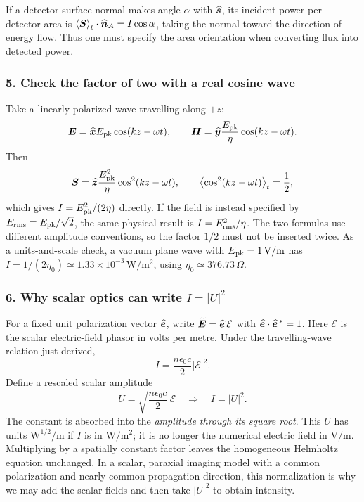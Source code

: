 If a detector surface normal makes angle $\alpha$ with
$\widehat{\bm{s}}$, its incident power per detector area is
$\left\langle \bm{S}\right\rangle_t\cdot\widehat{\bm{n}}_A=I\cos\alpha$, taking the normal
toward the direction of energy flow. Thus one must specify the area
orientation when converting flux into detected power.

\subsubsection*{5. Check the factor of two with a real cosine wave}
Take a linearly polarized wave travelling along $+z$:
\[
\bm{E}=\widehat{\bm{x}}E_{\rm pk}\cos(kz-\omega t),\qquad
\bm{H}=\widehat{\bm{y}}\frac{E_{\rm pk}}{\eta}
\cos(kz-\omega t).
\]
Then
\[
\bm{S}=\widehat{\bm{z}}\frac{E_{\rm pk}^2}{\eta}
\cos^2(kz-\omega t),\qquad
\left\langle \cos^2(kz-\omega t)\right\rangle_t=\frac12,
\]
which gives $I=E_{\rm pk}^2/(2\eta)$ directly.
If the field is instead specified by
$E_{\rm rms}=E_{\rm pk}/\sqrt2$, the same physical result is
$I=E_{\rm rms}^2/\eta$.
The two formulas use different amplitude conventions, so the factor
$1/2$ must not be inserted twice.
As a units-and-scale check, a vacuum plane wave with
$E_{\rm pk}=1\,\mathrm{V/m}$ has
$I=1/(2\eta_0)\simeq1.33\times10^{-3}\,\mathrm{W/m^2}$,
using $\eta_0\simeq376.73\,\Omega$.

\subsubsection*{6. Why scalar optics can write \texorpdfstring{$I=|U|^2$}{I = |U| squared}}
For a fixed unit polarization vector $\widehat{\bm{e}}$, write
$\widetilde{\bm{E}}=\widehat{\bm{e}}\,\mathcal E$ with
$\widehat{\bm{e}}\cdot\widehat{\bm{e}}^{\,*}=1$.
Here $\mathcal E$ is the scalar electric-field phasor in volts per metre.
Under the travelling-wave relation just derived,
\[
I=\frac{n\epsilon_0c}{2}|\mathcal E|^2.
\]
Define a rescaled scalar amplitude
\begin{equation}
U=\sqrt{\frac{n\epsilon_0c}{2}}\,\mathcal E
\quad\Longrightarrow\quad I=|U|^2.
\label{eq:intensity-normalized-field}
\end{equation}
The constant is absorbed into the \emph{amplitude through its square root}.
This $U$ has units $\mathrm{W}^{1/2}/\mathrm m$ if $I$ is in
$\mathrm{W/m^2}$; it is no longer the numerical electric field in
$\mathrm{V/m}$.
Multiplying by a spatially constant factor leaves the homogeneous
Helmholtz equation unchanged. In a scalar, paraxial imaging model with
a common polarization and nearly common propagation direction, this
normalization is why we may add the scalar fields and then take
$|U|^2$ to obtain intensity.

